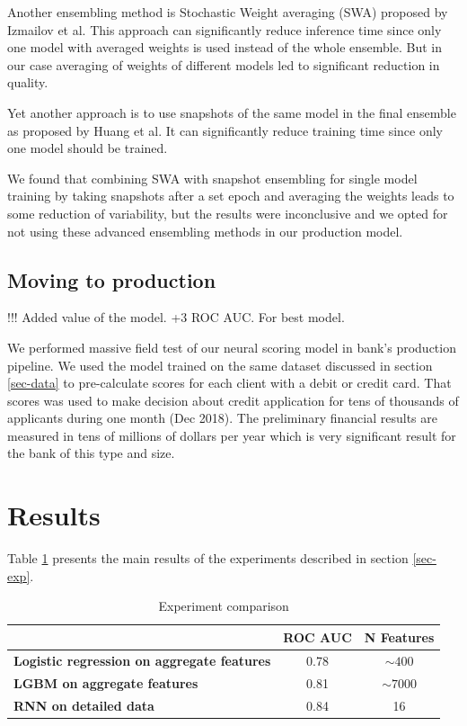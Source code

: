 \documentclass{sigkddExp}
\begin{document}
Another ensembling method is Stochastic Weight averaging (SWA) proposed by Izmailov et al.\cite{DBLP:journals/corr/LoshchilovH16a} This approach can significantly reduce inference time since only one model with averaged weights is used instead of the whole ensemble. But in our case averaging of weights of different models led to significant reduction in quality.

Yet another approach is to use snapshots of the same model in the final ensemble as proposed by Huang et al.\cite{DBLP:journals/corr/HuangLPLHW17} It can significantly reduce training time since only one model should be trained.

We found that combining SWA with snapshot ensembling for single model training by taking snapshots after a set epoch and averaging the weights leads to some reduction of variability, but the results were inconclusive and we opted for not using these advanced ensembling methods in our production model.


\subsection{Moving to production}

!!! Added value of the model. +3 ROC AUC. For best model.

We performed massive field test of our neural scoring model in bank's production pipeline. We used the model trained on the same dataset discussed in section \ref{sec-data} to pre-calculate scores for each client with a debit or credit card.
That scores was used to make decision about credit application for tens of thousands of applicants during one month (Dec 2018).
The preliminary financial results are measured in tens of millions of dollars per year which is very significant result for the bank of this type and size.

\section{Results}

Table \ref{tab-res} presents the main results of the experiments described in section \ref{sec-exp}.

\begin{table}[h]
\caption{Experiment comparison}
\begin{tabular}{ | p{12em} | c | c | }
\hline
& \textbf{ROC AUC} & \textbf{N Features} \\
\hline
\textbf{Logistic regression on aggregate features} & 0.78 & $\sim400$ \\
\textbf{LGBM on aggregate features} & 0.81 & $\sim7000$ \\
\textbf{RNN on detailed data} & 0.84 & 16 \\
\hline
\end{tabular}
\label{tab-res}
\end{table}
\end{document}
